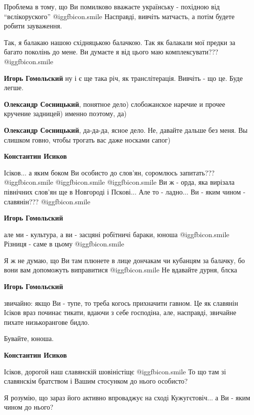 \begin{itemize}
\begin{itemize}
Проблема в тому, що Ви помилково вважаєте українську - похідною від
\enquote{вєлікоруского}  @igg{fbicon.smile}  Насправді, вивчіть матчасть, а потім будете робити
зауваження.

Так, я балакаю нашою східняцькою балачкою. Так як балакали мої предки за багато
поколінь до мене. Ви думаєте я від цього маю комплексувати???  @igg{fbicon.smile} 


\textbf{Игорь Гомольский} ну і є ще така річ, як транслітерація. Вивчіть - що це. Буде легше.

\textbf{Олександр Сосницький}, понятное дело) слобожанское наречие и прочее кручение задницей) именно поэтому, да)

\textbf{Олександр Сосницький}, да-да-да, ясное дело. Не, давайте дальше без меня. Вы слишком говно, чтобы трогать вас даже носками сапог)

\textbf{Константин Исиков} 

Ісіков... а яким боком Ви особисто до слов'ян, соромлюсь запитать???
@igg{fbicon.smile}   @igg{fbicon.smile}   @igg{fbicon.smile}  Ви ж - орда, яка
вирізала північних слов'ян ще в Новгороді і Пскові... Але то - ладно... Ви -
яким чином - славянін???  @igg{fbicon.smile} 

\textbf{Игорь Гомольский} 

але ми - культура, а ви - засцяні робітничі бараки, юноша  @igg{fbicon.smile}
Різниця - саме в цьому  @igg{fbicon.smile} 

Я ж не думаю, що Ви там плюнете в лице дончакам чи кубанцям за балачку, бо вони
вам допоможуть виправитися  @igg{fbicon.smile} Не вдавайте дурня, блска

\textbf{Игорь Гомольский} 

звичайно: якщо Ви - тупе, то треба когось прихначити гавном. Це як славянін
Ісіков враз починає тикати, вдаючи з себе господіна, але, насправді, звичайне
пихате низькорангове бидло.

Бувайте, юноша.

\textbf{Константин Исиков} 

Ісіков, дорогой наш славянскій шовіністіщє  @igg{fbicon.smile}  То що там зі славянскім братством
і Вашим стосунком до нього особисто?

Я розумію, що зараз його активно впроваджує на сході Кужугєтовіч... а Ви - яким
чином до нього?


\end{itemize}
\end{itemize}

